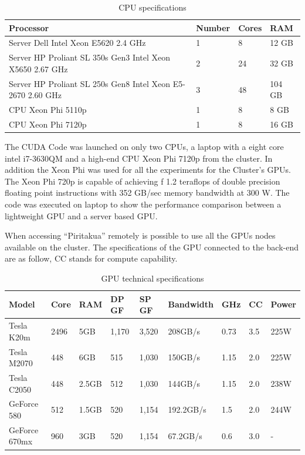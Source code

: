 \begin{table}[h]
\centering
\begin{tabular}{ | p{7.1cm}  | l | l | l |}
  \hline
  Processor & Number & Cores & RAM  \\
  \hline
  Server Dell Intel Xeon E5620 2.4 GHz & 1 & 8 & 12 GB \\
  \hline
  Server HP Proliant SL 350s Gen3 Intel Xeon X5650 2.67 GHz & 2 & 24 & 32 GB \\
  \hline
   Server HP Proliant SL 250s Gen8 Intel Xeon E5-2670 2.60 GHz & 3 & 48 & 104 GB \\
   \hline
   CPU Xeon Phi  5110p & 1 & 8 & 8 GB\\
   \hline
   CPU Xeon Phi 7120p  & 1 & 8 & 16 GB\\
   \hline
  \end{tabular}
      \caption{CPU specifications}
  \label{tab:cpus}
  \end{table}
  
 The CUDA Code was launched on only two CPUs, a laptop with a eight core intel i7-3630QM and a high-end CPU Xeon Phi 7120p from the cluster. In addition the Xeon Phi was used for all the experiments for the Cluster's GPUs. The Xeon Phi 720p is capable of achieving f 1.2 teraflops of double precision floating point instructions with 352 GB/sec memory bandwidth at 300 W. The code was executed on laptop to show the performance comparison between a lightweight GPU and a server based GPU.

When accessing ``Piritakua'' remotely is possible to use all the GPUs nodes available on the cluster. The specifications of the GPU connected to the back-end are as follow, CC stands for compute capability.

\begin{table}[h]
\centering
  \begin{tabular}{ |  l  |  l  |  l  |  l  |  l  | l | l | l |l | }
    \hline
    Model & Core& RAM& DP GF& SP GF& Bandwidth& GHz& CC & Power\\
    \hline
    Tesla K20m & 2496 & 5GB & 1,170 & 3,520 & 208GB/s & 0.73 & 3.5 & 225W \\
   \hline
    Tesla M2070 & 448 & 6GB & 515 & 1,030 & 150GB/s & 1.15 &  2.0 & 225W\\
   \hline
     Tesla C2050 & 448 & 2.5GB & 512 & 1,030 & 144GB/s & 1.15  & 2.0 & 238W \\
   \hline
      GeForce 580 & 512 & 1.5GB & 520 & 1,154 & 192.2GB/s & 1.5 & 2.0 & 244W \\
   \hline
   GeForce 670mx & 960 & 3GB & 520 & 1,154 & 67.2GB/s & 0.6 & 3.0 &  - \\
   \hline
  \end{tabular}
    \caption{GPU technical specifications}
  \label{tab:gpus}
  \end{table}
  
